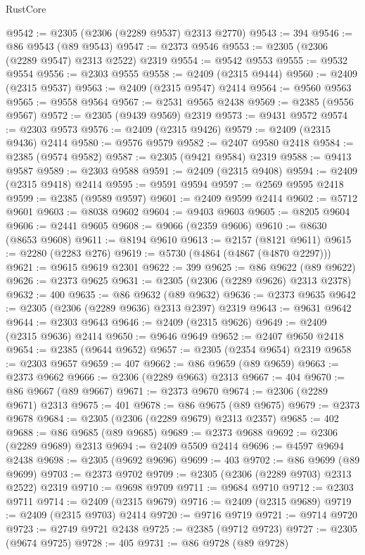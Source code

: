 \begin{lexlean}{RustCore}
\begin{coremodule}
@9542 := @2305 (@2306 (@2289 @9537) @2313 @2770)
@9543 := 394
@9546 := @86 @9543 (@89 @9543)
@9547 := @2373 @9546
@9553 := @2305 (@2306 (@2289 @9547) @2313 @2522) @2319
@9554 := @9542 @9553
@9555 := @9532 @9554
@9556 := @2303 @9555
@9558 := @2409 (@2315 @9444)
@9560 := @2409 (@2315 @9537)
@9563 := @2409 (@2315 @9547) @2414
@9564 := @9560 @9563
@9565 := @9558 @9564
@9567 := @2531 @9565 @2438
@9569 := @2385 (@9556 @9567)
@9572 := @2305 (@9439 @9569) @2319
@9573 := @9431 @9572
@9574 := @2303 @9573
@9576 := @2409 (@2315 @9426)
@9579 := @2409 (@2315 @9436) @2414
@9580 := @9576 @9579
@9582 := @2407 @9580 @2418
@9584 := @2385 (@9574 @9582)
@9587 := @2305 (@9421 @9584) @2319
@9588 := @9413 @9587
@9589 := @2303 @9588
@9591 := @2409 (@2315 @9408)
@9594 := @2409 (@2315 @9418) @2414
@9595 := @9591 @9594
@9597 := @2569 @9595 @2418
@9599 := @2385 (@9589 @9597)
@9601 := @2409 @9599 @2414
@9602 := @5712 @9601
@9603 := @8038 @9602
@9604 := @9403 @9603
@9605 := @8205 @9604
@9606 := @2441 @9605
@9608 := @9066 (@2359 @9606)
@9610 := @8630 (@8653 @9608)
@9611 := @8194 @9610
@9613 := @2157 (@8121 @9611)
@9615 := @2280 (@2283 @276)
@9619 := @5730 (@4864 (@4867 (@4870 @2297)))
@9621 := @9615 @9619 @2301
@9622 := 399
@9625 := @86 @9622 (@89 @9622)
@9626 := @2373 @9625
@9631 := @2305 (@2306 (@2289 @9626) @2313 @2378)
@9632 := 400
@9635 := @86 @9632 (@89 @9632)
@9636 := @2373 @9635
@9642 := @2305 (@2306 (@2289 @9636) @2313 @2397) @2319
@9643 := @9631 @9642
@9644 := @2303 @9643
@9646 := @2409 (@2315 @9626)
@9649 := @2409 (@2315 @9636) @2414
@9650 := @9646 @9649
@9652 := @2407 @9650 @2418
@9654 := @2385 (@9644 @9652)
@9657 := @2305 (@2354 @9654) @2319
@9658 := @2303 @9657
@9659 := 407
@9662 := @86 @9659 (@89 @9659)
@9663 := @2373 @9662
@9666 := @2306 (@2289 @9663) @2313
@9667 := 404
@9670 := @86 @9667 (@89 @9667)
@9671 := @2373 @9670
@9674 := @2306 (@2289 @9671) @2313
@9675 := 401
@9678 := @86 @9675 (@89 @9675)
@9679 := @2373 @9678
@9684 := @2305 (@2306 (@2289 @9679) @2313 @2357)
@9685 := 402
@9688 := @86 @9685 (@89 @9685)
@9689 := @2373 @9688
@9692 := @2306 (@2289 @9689) @2313
@9694 := @2409 @5509 @2414
@9696 := @4597 @9694 @2438
@9698 := @2305 (@9692 @9696)
@9699 := 403
@9702 := @86 @9699 (@89 @9699)
@9703 := @2373 @9702
@9709 := @2305 (@2306 (@2289 @9703) @2313 @2522) @2319
@9710 := @9698 @9709
@9711 := @9684 @9710
@9712 := @2303 @9711
@9714 := @2409 (@2315 @9679)
@9716 := @2409 (@2315 @9689)
@9719 := @2409 (@2315 @9703) @2414
@9720 := @9716 @9719
@9721 := @9714 @9720
@9723 := @2749 @9721 @2438
@9725 := @2385 (@9712 @9723)
@9727 := @2305 (@9674 @9725)
@9728 := 405
@9731 := @86 @9728 (@89 @9728)

\end{coremodule}
\end{lexlean}
